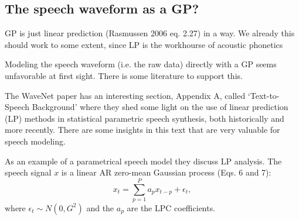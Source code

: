 \begin{chapterappendices}{5}
\section{The speech waveform as a GP?}


GP is just linear prediction (Rasmussen 2006 eq. 2.27) in a way.
We already this should work to some extent, since LP is the workhourse of acoustic phonetics

Modeling the speech waveform (i.e. the raw data) directly with a GP seems unfavorable at first sight.
There is some literature to support this.

The WaveNet paper \citep{Oord2016} has an interesting section, Appendix A, called `Text-to-Speech Background' where they shed some light on the use of linear prediction (LP) methods in statistical parametric speech synthesis, both historically and more recently.
There are some insights in this text that are very valuable for speech modeling.

As an example of a parametrical speech model they discuss LP analysis.
The speech signal $x$ is a linear AR zero-mean Gaussian process (Eqs.  6 and 7):
$$ x_t = \sum_{p=1}^P a_p x_{t-p} + \epsilon_t, $$
where $\epsilon_t \sim N(0,G^2)$ and the $a_p$ are the LPC coefficients.


\end{chapterappendices}
